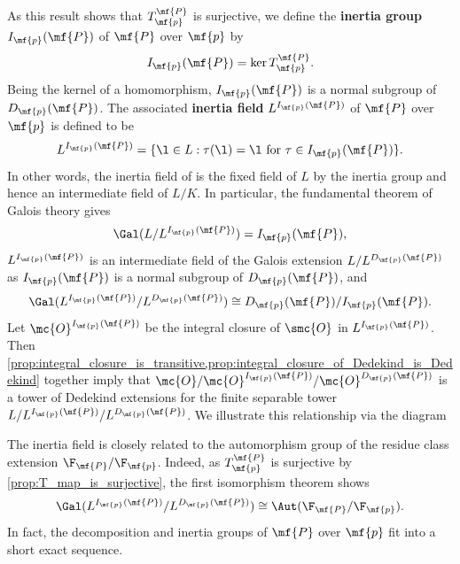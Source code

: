 \documentclass[12pt]{article}
\begin{document}
      As this result shows that \(T_{\mf{p}}^{\mf{P}}\) is surjective, we define the \textbf{inertia group} \(I_{\mf{p}}(\mf{P})\) of \(\mf{P}\)  over \(\mf{p}\) by
      \[
        I_{\mf{p}}(\mf{P}) = \ker{T_{\mf{p}}^{\mf{P}}}.
      \]
      Being the kernel of a homomorphism, \(I_{\mf{p}}(\mf{P})\) is a normal subgroup of \(D_{\mf{p}}(\mf{P})\). The associated \textbf{inertia field} \(L^{I_{\mf{p}}(\mf{P})}\) of \(\mf{P}\) over \(\mf{p}\) is defined to be
      \[
        L^{I_{\mf{p}}(\mf{P})} = \{\l \in L:\tau(\l) = \l \text{ for } \tau \in I_{\mf{p}}(\mf{P})\}.
      \]
      In other words, the inertia field of is the fixed field of \(L\) by the inertia group and hence an intermediate field of \(L/K\). In particular, the fundamental theorem of Galois theory gives
      \[
        \Gal(L/L^{I_{\mf{p}}(\mf{P})}) = I_{\mf{p}}(\mf{P}),
      \]
      \(L^{I_{\mf{p}}(\mf{P})}\) is an intermediate field of the Galois extension \(L/L^{D_{\mf{p}}(\mf{P})}\) as \(I_{\mf{p}}(\mf{P})\) is a normal subgroup of \(D_{\mf{p}}(\mf{P})\), and
      \[
        \Gal(L^{I_{\mf{p}}(\mf{P})}/L^{D_{\mf{p}}(\mf{P})}) \cong D_{\mf{p}}(\mf{P})/I_{\mf{p}}(\mf{P}).
      \]
      Let \(\mc{O}^{I_{\mf{p}}(\mf{P})}\) be the integral closure of \(\smc{O}\) in \(L^{I_{\mf{p}}(\mf{P})}\). Then \cref{prop:integral_closure_is_transitive,prop:integral_closure_of_Dedekind_is_Dedekind} together imply that \(\mc{O}/\mc{O}^{I_{\mf{p}}(\mf{P})}/\mc{O}^{D_{\mf{p}}(\mf{P})}\) is a tower of Dedekind extensions for the finite separable tower \(L/L^{I_{\mf{p}}(\mf{P})}/L^{D_{\mf{p}}(\mf{P})}\). We illustrate this relationship via the diagram
      \begin{center}
      \end{center}
      The inertia field is closely related to the automorphism group of the residue class extension \(\F_{\mf{P}}/\F_{\mf{p}}\). Indeed, as \(T_{\mf{p}}^{\mf{P}}\) is surjective by \cref{prop:T_map_is_surjective}, the first isomorphism theorem shows
      \[
        \Gal(L^{I_{\mf{p}}(\mf{P})}/L^{D_{\mf{p}}(\mf{P})}) \cong \Aut(\F_{\mf{P}}/\F_{\mf{p}}).
      \]
      In fact, the decomposition and inertia groups of \(\mf{P}\) over \(\mf{p}\) fit into a short exact sequence.
\end{document}
